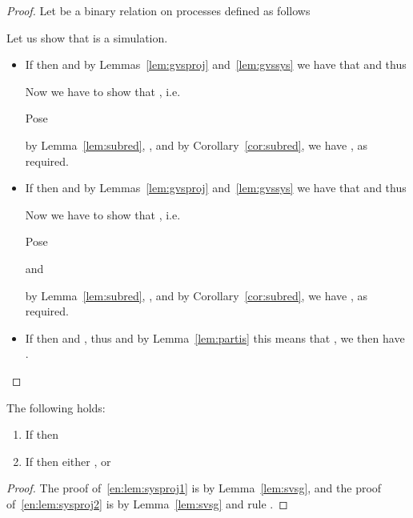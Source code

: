 
\thmsimu


\begin{proof}
  Let  be a binary relation on processes defined as follows
  
  Let us show that  is a simulation.
  \begin{itemize}
  \item If 
    then 
    and by Lemmas~\ref{lem:gvsproj} and~\ref{lem:gvssys}
    we have that 
    and thus 

    Now we have to show that , i.e.
    
    Pose
    
    by Lemma~\ref{lem:subred}, ,
    and by Corollary~\ref{cor:subred}, we have
    , as required.

\item If 
    then 
    and by Lemmas~\ref{lem:gvsproj} and~\ref{lem:gvssys}
    we have that 
    and thus 
    
    Now we have to show that , i.e.
    
    Pose
    
    and 
    
    
    by Lemma~\ref{lem:subred}, ,
    and by Corollary~\ref{cor:subred}, we have
    , as required.
    
  \item If  
    then  and ,
    thus 
    and by Lemma~\ref{lem:partis} this means that ,
    we then have .
  \end{itemize}
\end{proof}





\begin{lemma}\label{lem:sysproj}
  The following holds:
  \begin{enumerate}
  \item \label{en:lem:sysproj1}
    If 
    then 
   
  \item \label{en:lem:sysproj2}
    If 
    then either ,
    or  
  \end{enumerate}
\end{lemma}
\begin{proof}
  The proof of~\ref{en:lem:sysproj1} is by Lemma~\ref{lem:svsg},
  and the proof of~\ref{en:lem:sysproj2}
  is by Lemma~\ref{lem:svsg} and rule .
\end{proof}
\medskip






\thmbisim

